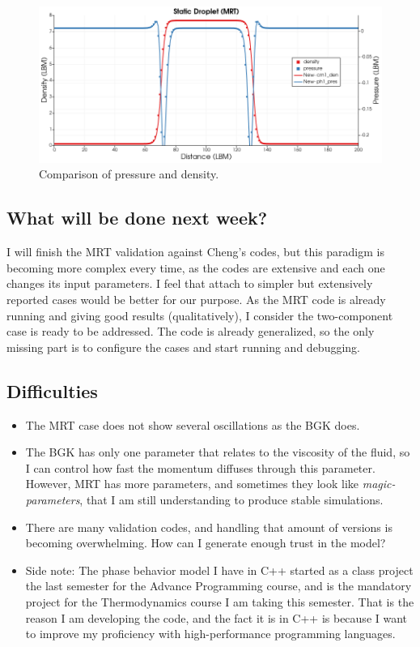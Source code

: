 \documentclass[12pt]{article}
\begin{document}
	\begin{figure}[h]
		\centering
		\includegraphics[scale=0.4]{pics/MRT_StaticDroplet_PRho.png}
		\caption{Comparison of pressure and density.}
		\label{fig:val1CMRT}
	\end{figure}
	 
	\subsection*{What will be done next week?}
	I will finish the MRT validation against Cheng's codes, but this paradigm is becoming more complex every time, as the codes are extensive and each one changes its input parameters. I feel that attach to simpler but extensively reported cases would be better for our purpose. As the MRT code is already running and giving good results (qualitatively), I consider the two-component case is ready to be addressed. The code is already generalized, so the only missing part is to configure the cases and start running and debugging. 
	
	\subsection*{Difficulties}
	\begin{itemize}
		\item The MRT case does not show several oscillations as the BGK does. 

		\item The BGK has only one parameter that relates to the viscosity of the fluid, so I can control how fast the momentum diffuses through this parameter. However, MRT has more parameters, and sometimes they look like \textit{magic-parameters}, that I am still understanding to produce stable simulations.
		\item There are many validation codes, and handling that amount of versions is becoming overwhelming. How can I generate enough trust in the model?
		\item Side note: The phase behavior model I have in C++ started as a class project the last semester for the Advance Programming course, and is the mandatory project for the Thermodynamics course I am taking this semester. That is the reason I am developing the code, and the fact it is in C++ is because I want to improve my proficiency with high-performance programming languages. 
	\end{itemize}
	\printbibliography %
\end{document}
